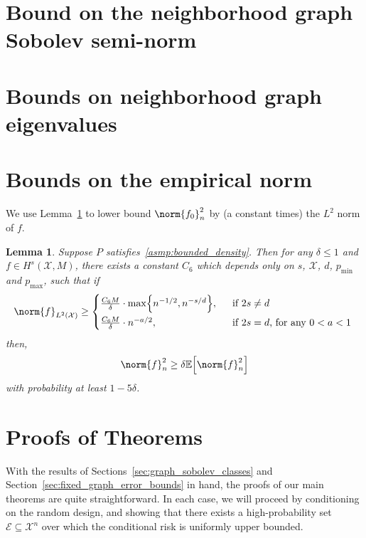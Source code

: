 \documentclass{article}
\newcommand{\1}{\mathbf{1}}
\newcommand{\Xset}{\mathcal{X}}
\newcommand{\Leb}{L}
\newcommand{\mc}[1]{\mathcal{#1}}
\newcommand{\Ebb}{\mathbb{E}}
\theoremstyle{alden}
\theoremstyle{aldenthm}
\newtheorem{lemma}{Lemma}
\theoremstyle{definition}
\theoremstyle{remark}
\begin{document}
\section{Bound on the neighborhood graph Sobolev semi-norm}
\label{sec:graph_sobolev_seminorm}


\section{Bounds on neighborhood graph eigenvalues}
\label{sec:graph_eigenvalues}

\section{Bounds on the empirical norm}
\label{sec:empirical_norm}

We use Lemma~\ref{lem:empirical_norm_sobolev} to lower bound $\norm{f_0}_n^2$ by (a constant times) the $\Leb^2$ norm of $f$.

\begin{lemma}
	\label{lem:empirical_norm_sobolev}
	Suppose $P$ satisfies~\ref{asmp:bounded_density}. Then for any $\delta \leq 1$ and $f \in H^s(\Xset,M)$, there exists a constant $C_6$ which depends only on $s$, $\Xset$, $d$, $p_{\min}$ and $p_{\max}$, such that if 
	\begin{equation}
	\label{eqn:empirical_norm_sobolev_1}
	\norm{f}_{\Leb^2(\Xset)} \geq 
	\begin{cases*}
	\frac{C_6 M}{\delta} \cdot \max\Bigl\{n^{-1/2},n^{-s/d}\Bigr\},& ~~\textrm{if $2s \neq d$} \\
	\frac{C_6 M}{\delta} \cdot n^{-a/2},& ~~\textrm{if $2s = d$, for any $0 < a < 1$}
	\end{cases*}
	\end{equation}
	then,
	\begin{equation}
	\label{eqn:empirical_norm_sobolev}
	\norm{f}_n^2 \geq \delta \Ebb\Bigl[\norm{f}_n^2\Bigr] 
	\end{equation}
	with probability at least $1 - 5 \delta$.
\end{lemma}


\section{Proofs of Theorems}
\label{sec:proofs_theorems}
With the results of Sections~\ref{sec:graph_sobolev_classes} and Section~\ref{sec:fixed_graph_error_bounds} in hand, the proofs of our main theorems are quite straightforward. In each case, we will proceed by conditioning on the random design, and showing that there exists a high-probability set $\mc{E} \subseteq \Xset^n$ over which the conditional risk is uniformly upper bounded.
\end{document}
